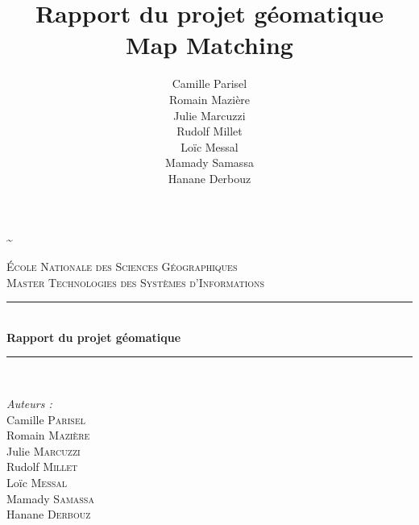 \documentclass[11pt,a4paper]{report} %
\title{Rapport du projet géomatique \\ Map Matching}
\author{Camille Parisel \\ Romain Mazière \\ Julie Marcuzzi \\ Rudolf Millet \\ Loïc Messal \\ Mamady Samassa \\ Hanane Derbouz}
\begin{document}
\begin{titlepage}
		
	\~ 
	\newline
	\\[2cm]
	\newcommand{\HRule}{\rule{\linewidth}{0.5mm}} %
		
	\center %
		
		
	\textsc{\LARGE \'Ecole Nationale des Sciences Géographiques}\\[0.5cm] %
	\textsc{\Large Master Technologies des Systèmes d'Informations}\\[0.5cm] %
		
	\HRule \\[0.4cm]
	{ \huge \bfseries Rapport du projet géomatique}\\[0.4cm] %
	\HRule \\[1.5cm]
	\vfill
		
	\begin{minipage}[t]{0.4\textwidth}
		\begin{flushleft} \large
			\emph{Auteurs : } \newline \\
			Camille \textsc{Parisel} \\ 
			Romain \textsc{Mazière} \\ 
			Julie \textsc{Marcuzzi} \\ 
			Rudolf \textsc{Millet} \\ 
			Loïc \textsc{Messal} \\ 
			Mamady \textsc{Samassa} \\ 
			Hanane \textsc{Derbouz}
						

\end{flushleft}
\end{minipage}
\end{titlepage}
\end{document}
